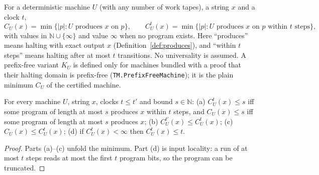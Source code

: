 \begin{definition}
  \label{def:kolmogorov}
  \leanok
  For a deterministic machine $U$ (with any number of work tapes), a string
  $x$ and a clock $t$,
  \[
    C_U(x) = \min\{|p| : U \text{ produces } x \text{ on } p\},\qquad
    C^t_U(x) = \min\{|p| : U \text{ produces } x \text{ on } p
      \text{ within } t \text{ steps}\},
  \]
  with values in $\mathbb{N} \cup \{\infty\}$ and value $\infty$ when no
  program exists. Here ``produces'' means halting with exact output $x$
  (Definition~\ref{def:produces}), and ``within $t$ steps'' means halting
  after at most $t$ transitions. No universality is assumed. A prefix-free
  variant $K_U$ is defined only for machines bundled with a proof that their
  halting domain is prefix-free (\texttt{TM.PrefixFreeMachine}); it is the
  plain minimum $C_U$ of the certified machine.
\end{definition}

\begin{lemma}
  \label{lem:meta-kolmogorov-basic}
  \leanok
  For every machine $U$, string $x$, clocks $t \le t'$ and bound
  $s \in \mathbb{N}$: (a) $C^t_U(x) \le s$ iff some program of length at most
  $s$ produces $x$ within $t$ steps, and $C_U(x) \le s$ iff some program of
  length at most $s$ produces $x$; (b) $C^{t'}_U(x) \le C^t_U(x)$; (c) $C_U(x) \le
  C^t_U(x)$; (d) if $C^t_U(x) < \infty$ then $C^t_U(x) \le t$.
\end{lemma}
\begin{proof}
  \leanok
  Parts (a)--(c) unfold the minimum. Part (d) is input locality: a run of at
  most $t$ steps reads at most the first $t$ program bits, so the program can
  be truncated.
\end{proof}

